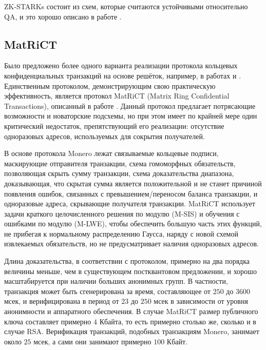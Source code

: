 \documentclass{mrl}
\begin{document}
ZK-STARKs состоит из схем, которые считаются устойчивыми относительно QA, и это хорошо описано в работе \cite{ben2018scalable}.

\subsection{MatRiCT}

Было предложено более одного варианта реализации протокола кольцевых конфиденциальных транзакций на основе решёток, например, в работах \cite{esgin2019matrict} и \cite{torres2019lattice}. Единственным протоколом, демонстрирующим свою практическую эффективность, является протокол MatRiCT (Matrix Ring Confidential Transactions), описанный в работе \cite{esgin2019matrict}. Данный протокол предлагает потрясающие возможности и новаторские подсхемы, но при этом имеет по крайней мере один критический недостаток, препятствующий его реализации: отсутствие одноразовых адресов, используемых для сокрытия получателей.

В основе протокола Monero лежат связываемые кольцевые подписи, маскирующие отправителя транзакции, схема гомоморфных обязательств, позволяющая скрыть сумму транзакции, схема доказательства диапазона, доказывающая, что скрытая сумма является положительной и не станет причиной появления ошибок, связанных с превышением/переносом баланса транзакции, и одноразовые адреса, скрывающие получателя транзакции. MatRiCT использует задачи краткого целочисленного решения по модулю (M-SIS) и обучения с ошибками по модулю (M-LWE), чтобы обеспечить большую часть этих функций, не прибегая к нормальному распределению Гаусса, наряду с новой схемой извлекаемых обязательств, но не предусматривает наличия одноразовых адресов.

Длина доказательства, в соответствии с протоколом, примерно на два порядка величины меньше, чем в существующем постквантовом предложении, и хорошо масштабируется при наличии больших анонимных групп. В частности, транзакция может быть сгенерирована за время, составляющее от $250$ до $3600$ мсек, и верифицирована в период от $23$ до $250$ мсек в зависимости от уровня анонимности и аппаратного обеспечения. В случае MatRiCT размер публичного ключа составляет примерно $4$ Кбайта, то есть примерно столько же, сколько и в случае RSA. Верификация транзакций, подобных транзакциям Monero, занимает около $25$ мсек, а сами они занимают примерно $100$ Кбайт.
\end{document}

